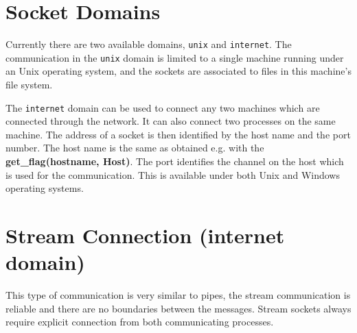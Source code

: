 \section{Socket Domains}
Currently there are two available domains, {\tt unix} and
{\tt internet}.
The communication in the {\tt unix} domain is limited
to a single machine running under an Unix operating system, and the sockets 
are associated
to files in this machine's file system.

The {\tt internet} domain can be used to connect any two machines
which are connected through the network. It can also connect two processes
on the same machine.
The address of a socket is then identified
by the host name and the port number.
The host name is the same as obtained e.g. with the
{\bf get_flag(hostname, Host)}.
The port identifies the channel on the host which is used
for the communication. This is available under both Unix and Windows
operating systems.


\section{Stream Connection (internet domain)}
This type of communication is very similar to pipes,
the stream communication is reliable and there are no boundaries
between the messages.
Stream sockets always require explicit connection from both
communicating processes.

